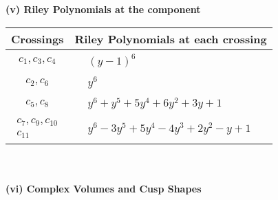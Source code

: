 \documentclass[1p]{elsarticle_modified}
\theoremstyle{definition}
\begin{document}
\newpage\renewcommand{\arraystretch}{1}
\flushleft \textbf{(v) Riley Polynomials at the component}\newline \\
\begin{tabular}{m{50pt}|m{274pt}}
Crossings & \hspace{64pt}Riley Polynomials at each crossing \\
\hline $$\begin{aligned}c_{1},c_{3},c_{4}\end{aligned}$$&$\begin{aligned}
&(y-1)^6
\end{aligned}$\\
\hline $$\begin{aligned}c_{2},c_{6}\end{aligned}$$&$\begin{aligned}
&y^6
\end{aligned}$\\
\hline $$\begin{aligned}c_{5},c_{8}\end{aligned}$$&$\begin{aligned}
&y^6+y^5+5 y^4+6 y^2+3 y+1
\end{aligned}$\\
\hline $$\begin{aligned}c_{7},c_{9},c_{10}\\c_{11}\end{aligned}$$&$\begin{aligned}
&y^6-3 y^5+5 y^4-4 y^3+2 y^2- y+1
\end{aligned}$\\
\hline
\end{tabular}\\~\\
\newpage\flushleft \textbf{(vi) Complex Volumes and Cusp Shapes}
\end{document}
